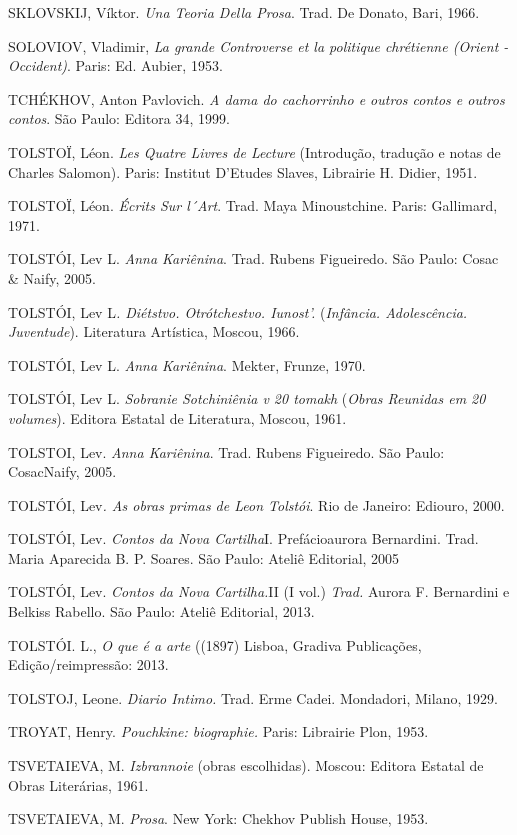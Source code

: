 {SKLOVSKIJ, Víktor. \emph{Una Teoria Della Prosa}. Trad. De Donato,
Bari, 1966.

SOLOVIOV, Vladimir, \emph{La grande Controverse et la politique
chrétienne (Orient -Occident)}. Paris: Ed. Aubier, 1953.

TCHÉKHOV, Anton Pavlovich. \emph{A dama do cachorrinho e outros contos e
outros contos}. São Paulo: Editora 34, 1999.

TOLSTOÏ, Léon. \emph{Les Quatre Livres de Lecture} (Introdução,
tradução e notas de Charles Salomon). Paris: Institut D'Etudes Slaves,
Librairie H. Didier, 1951.

TOLSTOÏ, Léon. \emph{Écrits Sur l´Art}. Trad. Maya Minoustchine. Paris:
Gallimard, 1971.

TOLSTÓI, Lev L. \emph{Anna Kariênina}. Trad. Rubens Figueiredo. São
Paulo: Cosac \& Naify, 2005.

TOLSTÓI, Lev L\emph{. Diétstvo. Otrótchestvo.
Iunost'.} (\emph{Infância. Adolescência. Juventude}). Literatura
Artística, Moscou, 1966.

TOLSTÓI, Lev L. \emph{Anna Kariênina}. Mekter, Frunze, 1970.

TOLSTÓI, Lev L. \emph{Sobranie Sotchiniênia v 20 tomakh} (\emph{Obras
Reunidas em 20 volumes}). Editora Estatal de Literatura, Moscou, 1961.

TOLSTOI, Lev. \emph{Anna Kariênina}. Trad. Rubens Figueiredo. São
Paulo: CosacNaify, 2005.

TOLSTÓI, Lev\emph{. As obras primas de Leon Tolstói}. Rio de Janeiro:
Ediouro, 2000.

TOLSTÓI, Lev. \emph{Contos da Nova Cartilha}I. Prefácioaurora
Bernardini. Trad. Maria Aparecida B. P. Soares. São Paulo: Ateliê
Editorial, 2005

TOLSTÓI, Lev. \emph{Contos da Nova Cartilha.}II (I vol.) \emph{Trad.}
Aurora F. Bernardini e Belkiss Rabello. São Paulo: Ateliê Editorial,
2013.

TOLSTÓI. L., \emph{O que é a arte} ((1897) Lisboa, Gradiva Publicações,
Edição/reimpressão: 2013.

TOLSTOJ, Leone. \emph{Diario Intimo.} Trad. Erme Cadei. Mondadori,
Milano, 1929.

TROYAT, Henry. \emph{Pouchkine: biographie.} Paris: Librairie Plon,
1953.

TSVETAIEVA, M. \emph{Izbrannoie} (obras escolhidas). Moscou: Editora
Estatal de Obras Literárias, 1961.

TSVETAIEVA, M. \emph{Prosa}. New York: Chekhov Publish House, 1953.

}
